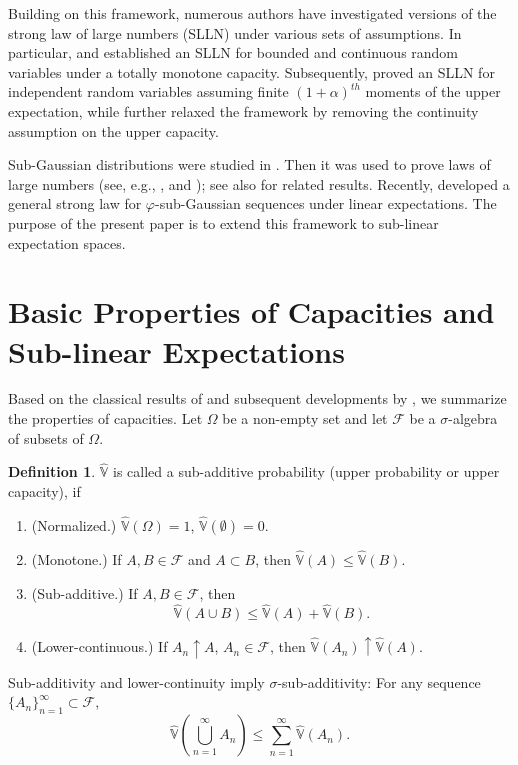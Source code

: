 \documentclass[12pt]{article}
\theoremstyle{definition}
\newtheorem{definition}[theorem]{Definition}
\theoremstyle{remark}
\numberwithin{equation}{section}
\def\Vh{{\hat{\mathbb{V}}}}
\def\FD{{\mathcal F}}                     \def\GD{{\cal G}}
\begin{document}
Building on this framework, numerous authors have investigated versions of the strong law of large numbers (SLLN) under various sets of assumptions. In particular, \cite{marinacci1999limit} and \cite{MaccheroniMarinacci2005} established an SLLN for bounded and continuous random variables under a totally monotone capacity. Subsequently, \cite{ChenZ2013} proved an SLLN for independent random variables assuming finite $(1+\alpha)^{th}$ moments of the upper expectation, while \cite{Chen2012} further relaxed the framework by removing the continuity assumption on the upper capacity.


Sub-Gaussian distributions were studied  in \cite{Kahane1960}. Then 
it was used to prove laws of large numbers (see, e.g., \cite{Chow1966},  \cite{Taylor1987} and \cite{Buldygin2000}); see also \cite{Antonini2013} for related results. Recently, \cite{Zajkowski2021} developed a general strong law for $\varphi$-sub-Gaussian sequences under linear expectations. The purpose of the present paper is to extend this framework to sub-linear expectation spaces.
\section{Basic Properties of Capacities and Sub-linear Expectations} \label{sublinear}
Based on the classical results of  \cite{Choquet1954} and subsequent developments by \cite{Huber1973}, 
we summarize the properties of capacities.
Let $\Omega$ be a non-empty set and let $\FD$ be a $\sigma$-algebra of subsets of $\Omega$. 

%
\begin{definition} \label{defV}
$\Vh$ is called a sub-additive probability (upper probability or upper capacity), if 

\leavevmode
\begin{enumerate}
    \item (Normalized.) $\Vh(\Omega) = 1$, $\Vh(\emptyset) = 0$.
    \item (Monotone.) If $A, B \in \FD$ and $A \subset B$, then $\Vh(A) \leq \Vh(B)$.
    \item (Sub-additive.) If $A, B \in \FD$, then
    \[
    \Vh\left(A \cup B \right) \leq \Vh(A) + \Vh(B).
    \]
    \item (Lower-continuous.) If $A_n \uparrow A$, $A_n \in \FD$, 
    then $\Vh(A_n) \uparrow \Vh(A)$.
\end{enumerate}
\end{definition}
%
Sub-additivity and lower-continuity imply $\sigma$-sub-additivity:
  For any sequence $\{A_n\}_{n=1}^\infty \subset \FD$,
    \[
    \Vh\left(\bigcup_{n=1}^\infty A_n\right) \leq \sum_{n=1}^\infty \Vh(A_n).
    \]
    
\end{document}
